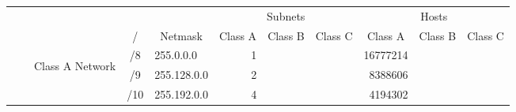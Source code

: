 \documentclass[11pt,a4paper]{article}
\begin{document}
\begin{table}[p!]
\begin{tabular}{ccccl|r|r|r|r|r|r|}
\cline{6-11}
                                                       &                                                        &                                                        &                          &                              & \multicolumn{3}{c|}{Subnets}                                                               & \multicolumn{3}{c|}{Hosts}                                                                 \\ \cline{4-11} 
                                                       &                                                        & \multicolumn{1}{c|}{}                                  & \multicolumn{1}{c|}{/}   & \multicolumn{1}{c|}{Netmask} & \multicolumn{1}{c|}{Class A} & \multicolumn{1}{c|}{Class B} & \multicolumn{1}{c|}{Class C} & \multicolumn{1}{c|}{Class A} & \multicolumn{1}{c|}{Class B} & \multicolumn{1}{c|}{Class C} \\ \cline{3-11} 
                                                       & \multicolumn{1}{c|}{}                                  & \multicolumn{1}{c|}{\multirow{23}{*}{\begin{sideways}Class A Network\end{sideways}}} & \multicolumn{1}{c|}{/8}  & 255.0.0.0                    & 1                            &                              &                              & 16777214                     &                              &                              \\ \cline{4-11} 
                                                       & \multicolumn{1}{c|}{}                                  & \multicolumn{1}{c|}{}                                  & \multicolumn{1}{c|}{/9}  & 255.128.0.0                  & 2                            &                              &                              & 8388606                      &                              &                              \\ \cline{4-11} 
                                                       & \multicolumn{1}{c|}{}                                  & \multicolumn{1}{c|}{}                                  & \multicolumn{1}{c|}{/10} & 255.192.0.0                  & 4                            &                              &                              & 4194302                      &                              &                              \\ \cline{4-11} 

\end{tabular}
\end{table}
\end{document}
